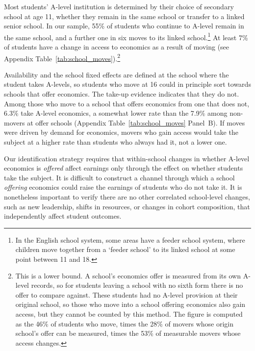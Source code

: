 


Most students' A-level institution is determined by their choice of secondary school at age 11, whether they remain in the same school or transfer to a linked senior school. In our sample, 55\% of students who continue to A-level remain in the same school, and a further one in six moves to its linked school.\footnote{In the English school system, some areas have a feeder school system, where children move together from a `feeder school' to its linked school at some point between 11 and 18.} At least 7\% of students have a change in access to economics as a result of moving (see Appendix Table~\ref{tab:school_moves}).\footnote{This is a lower bound. A school's economics offer is measured from its own A-level records, so for students leaving a school with no sixth form there is no offer to compare against. These students had no A-level provision at their original school, so those who move into a school offering economics also gain access, but they cannot be counted by this method. The figure is computed as the 46\% of students who move, times the 28\% of movers whose origin school's offer can be measured, times the 53\% of measurable movers whose access changes.}

Availability and the school fixed effects are defined at the school where the student takes A-levels, so students who move at 16 could in principle sort towards schools that offer economics. The take-up evidence indicates that they do not. Among those who move to a school that offers economics from one that does not, 6.3\% take A-level economics, a somewhat lower rate than the 7.9\% among non-movers at offer schools (Appendix Table~\ref{tab:school_moves} Panel~B). If moves were driven by demand for economics, movers who gain access would take the subject at a higher rate than students who always had it, not a lower one.


Our identification strategy requires that within-school changes in whether A-level economics is \emph{offered} affect earnings only through the effect on whether students take the subject. It is difficult to construct a channel through which a school \emph{offering} economics could raise the earnings of students who do not take it. It is nonetheless important to verify there are no other correlated school-level changes, such as new leadership, shifts in resources, or changes in cohort composition, that independently affect student outcomes.

